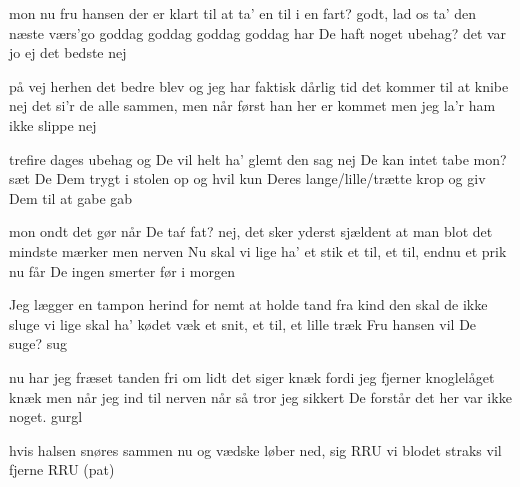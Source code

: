 \documentclass[a4paper,11pt]{article}
\begin{document}
\begin{song}

mon nu fru hansen der er klart
til at ta' en til i en fart? 
godt, lad os ta' den næste
værs'go 
 goddag goddag
 goddag goddag
har De haft noget ubehag? 
det var jo ej det bedste
 nej

på vej herhen det bedre blev
og jeg har faktisk dårlig tid
det kommer til at knibe
 nej
det si'r de alle sammen, men 
når først han her er kommet men
jeg la'r ham ikke slippe
nej

trefire dages ubehag 
og De vil helt ha' glemt den sag
nej De kan intet tabe
mon? 
sæt De Dem trygt i stolen op
og hvil kun Deres lange/lille/trætte krop 
og giv Dem til at gabe 
gab

mon ondt det gør når De taŕ fat? 
nej, det sker yderst sjældent at 
man blot det mindste mærker
men nerven 
Nu skal vi lige ha' et stik 
et til, et til, endnu et prik 
nu får De ingen smerter
før i morgen 

Jeg lægger en tampon herind 
for nemt at holde tand fra kind 
den skal de ikke sluge 
vi lige skal ha' kødet væk 
et snit, et til, et lille træk 
Fru hansen vil De suge? 
sug 


nu har jeg fræset tanden fri
om lidt det siger knæk fordi
jeg fjerner knoglelåget
knæk 
men når jeg ind til nerven når 
så tror jeg sikkert De forstår
det her var ikke noget.
 gurgl

hvis halsen snøres sammen nu 
og vædske løber ned, sig RRU
vi blodet straks vil fjerne
RRU (pat) 


\end{song}
\end{document}
